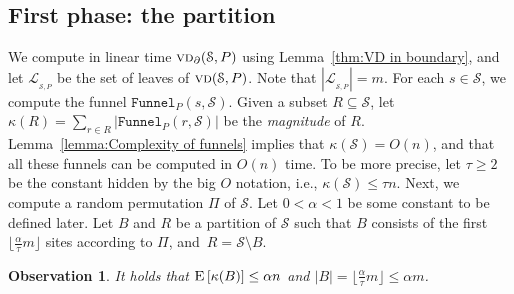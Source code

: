 \documentclass[a4paper,UKenglish]{socg-lipics-v2018}
\newtheorem{observation}[theorem]{Observation}
\newcommand{\s}{\mathcal S}
\newcommand{\funnel}[2][P]{\ensuremath{\mathtt{Funnel}_{\scriptscriptstyle #1}(#2)}}
\newcommand{\vd}[2][P]{\textsc{vd}(#2, #1)}
\newcommand{\cost}[1]{\kappa(#1)}
\newcommand{\bvd}[2][P]{\textsc{vd}_{\partial}(#2, #1)}
\newcommand{\ex}[1]{\textsc{E}\left[#1\right]}
\newcommand{\LL}[1][\s, P]{\ensuremath{\mathcal L_{_{#1}}}}
\begin{document}
\subsection{First phase: the partition}\label{section:First phase}
We compute in linear time $\bvd{\s}$ using Lemma~\ref{thm:VD in boundary}, and let $\LL$ be the set of leaves of $\vd{\s}$. Note that $|\LL| = m$. 
For each $s\in \s$, we compute the funnel $\funnel{s, \s}$. 
Given a subset $R\subseteq \s$, let $\cost{R} = \sum_{r\in R} |\funnel{r, \s}|$ be the \emph{magnitude} of $R$. 
Lemma~\ref{lemma:Complexity of funnels} implies that $\cost{\s} = O(n)$, and that all these funnels can be computed in $O(n)$ time. 
To be more precise, let $\tau\geq 2$ be the constant hidden by the big $O$ notation, i.e., $\cost{\s} \leq \tau n$. 
Next, we compute a random permutation $\Pi$ of $\s$. 
Let $0 < \alpha < 1$ be some constant to be defined later. 
Let $B$ and $R$ be a partition of $\s$ such that $B$ consists of the first $\lfloor \frac{\alpha}{\tau} m\rfloor$ sites according to $\Pi$, and~$R = \s\setminus B$. 

\begin{observation}\label{obs: Complexity of B and R}
It holds that $\ex{\cost{B}} \leq \alpha n$ and $|B|= \lfloor \frac{\alpha}{\tau} m\rfloor \leq \alpha m$. 
\end{observation}

\end{document}
